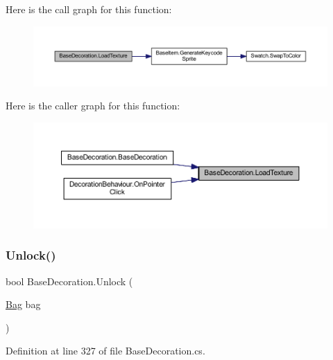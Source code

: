 Here is the call graph for this function\+:
\nopagebreak
\begin{figure}[H]
\begin{center}
\leavevmode
\includegraphics[width=350pt]{class_base_decoration_aafdc27ba3ede4f9eadc66e8dd6fa9b1a_cgraph}
\end{center}
\end{figure}
Here is the caller graph for this function\+:
\nopagebreak
\begin{figure}[H]
\begin{center}
\leavevmode
\includegraphics[width=350pt]{class_base_decoration_aafdc27ba3ede4f9eadc66e8dd6fa9b1a_icgraph}
\end{center}
\end{figure}
\mbox{\label{class_base_decoration_a820de02d0bb917f7cee59a4759da6251}} 
\subsubsection{\texorpdfstring{Unlock()}{Unlock()}}
{\footnotesize\ttfamily bool Base\+Decoration.\+Unlock (\begin{DoxyParamCaption}\item[{\mbox{\hyperlink{class_bag}{Bag}}}]{bag }\end{DoxyParamCaption})}



Definition at line 327 of file Base\+Decoration.\+cs.

